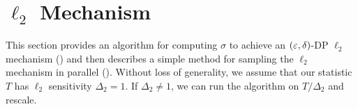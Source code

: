\section{\texorpdfstring{$\ell_2$ Mechanism}{L2 Mechanism}}
\label{sec:l2}
This section provides an algorithm for computing $\sigma$ to achieve an $(\varepsilon, \delta)$-DP $\ell_2$ mechanism () and then describes a simple method for sampling the $\ell_2$ mechanism in parallel (). Without loss of generality, we assume that our statistic $T$ has $\ell_2$ sensitivity $\Delta_2 = 1$. If $\Delta_2 \neq 1$, we can run the algorithm on $T / \Delta_2$ and rescale.


